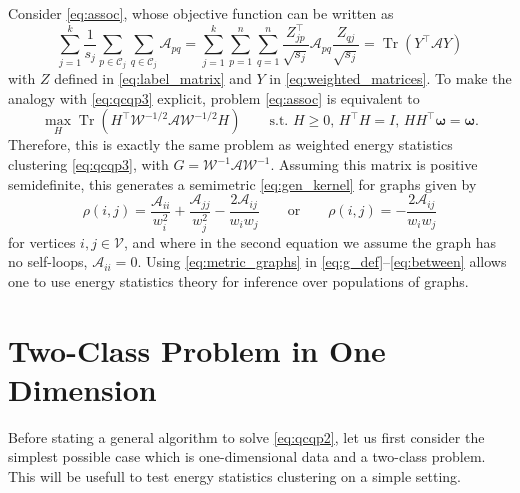 \documentclass[aps,preprint,nofootinbib,floatfix]{revtex4-1}
\DeclareMathOperator{\Tr}{Tr}
\newcommand\C{{\mathcal{C}}}
\begin{document}
Consider \eqref{eq:assoc}, whose objective function can be written as
\begin{equation}
\sum_{j=1}^k \dfrac{1}{s_j} \sum_{p \in \C_j} \sum_{q \in \C_j}
\mathcal{A}_{pq} = \sum_{j=1}^k \sum_{p=1}^n \sum_{q=1}^n 
\dfrac{Z^\top_{jp}}{\sqrt{s_j}} \mathcal{A}_{pq} \dfrac{Z_{qj}}{\sqrt{s_j}}
= \Tr\left( Y^\top \mathcal{A} Y \right)
\end{equation}
with $Z$ defined in \eqref{eq:label_matrix} and $Y$ in
\eqref{eq:weighted_matrices}. To make the analogy with \eqref{eq:qcqp3}
explicit,  problem \eqref{eq:assoc} is equivalent to
\begin{equation}
\max_H \Tr\left( H^\top \mathcal{W}^{-1/2} \mathcal{A} \mathcal{W}^{-1/2} H 
\right) \qquad \mbox{s.t. $H\ge 0$, $H^\top H = I$, $H H^\top
\bm{\omega}=\bm{\omega}$}.
\end{equation}
Therefore, this is exactly the same problem as weighted energy statistics
clustering \eqref{eq:qcqp3}, with 
$G = \mathcal{W}^{-1} \mathcal{A} \mathcal{W}^{-1}$. Assuming this
matrix is positive semidefinite, this generates a semimetric
\eqref{eq:gen_kernel} for graphs given by
\begin{equation}
\label{eq:metric_graphs}
\rho(i,j) = 
\dfrac{\mathcal{A}_{ii}}{w_i^{2}}
+\dfrac{\mathcal{A}_{jj}}{w_j^{2}}
-\dfrac{2 \mathcal{A}_{ij}}{w_i w_j} \qquad\mbox{or}\qquad
\rho(i,j) = -\dfrac{2 \mathcal{A}_{ij}}{w_i w_j}
\end{equation}
for vertices $i,j \in \mathcal{V}$, and 
where in the second equation we assume the graph has no self-loops,
$\mathcal{A}_{ii} = 0$. Using \eqref{eq:metric_graphs} 
in \eqref{eq:g_def}--\eqref{eq:between}
allows one to use energy statistics theory for inference
over populations of graphs.


\section{Two-Class Problem in One Dimension}
\label{sec:twoclass}

Before stating a general algorithm to solve \eqref{eq:qcqp2}, 
let us first consider the simplest possible case which
is one-dimensional data and a two-class problem. This will be usefull to test
energy statistics clustering on a simple setting.
\end{document}
